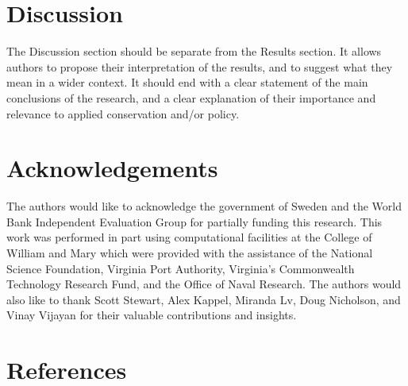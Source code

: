 \documentclass{article}\usepackage[]{graphicx}\usepackage[]{color}
\newenvironment{knitrout}{}{}  %
\begin{document}
\begin{knitrout}
\section{Discussion}
The Discussion section should be separate from the Results section. It allows authors to propose their interpretation of the results, and to suggest what they mean in a wider context. It should end with a clear statement of the main conclusions of the research, and a clear explanation of their importance and relevance to applied conservation and/or policy.

\section{Acknowledgements}
The authors would like to acknowledge the government of Sweden and the World Bank Independent Evaluation Group for partially funding this research.  This work was performed in part using computational facilities at the College of William and Mary which were provided with the assistance of the National Science Foundation, Virginia Port Authority, Virginia's Commonwealth Technology Research Fund, and the Office of Naval Research.  The authors would also like to thank Scott Stewart, Alex Kappel, Miranda Lv, Doug Nicholson, and Vinay Vijayan for their valuable contributions and insights.


\newpage
\section{References}
\printbibliography



\end{knitrout}
\end{document}
